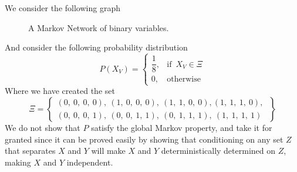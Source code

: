 \documentclass{article}
\numberwithin{equation}{section}
\theoremstyle{named}
\begin{document}
We consider the following graph
\begin{figure}[H]
        \centering
        
        \caption{A Markov Network of binary variables.}
        \label{fig:HCMarkovNetwork}
\end{figure}
And consider the following probability distribution
\[
        P(X_V) = \left\{ 
                \begin{matrix}
                        \dfrac{1}{8},& \text{if }\, X_V \in \Xi \\[3ex]
                        0,& \text{otherwise}

                        
                \end{matrix}
        \right.
\]
Where we have created the set 
\[
        \Xi = \left\{
                \begin{matrix}
                        (0,\ 0,\ 0,\ 0),\ (1,\ 0,\ 0,\ 0),\ (1,\ 1,\ 0,\ 0), 
                        (1,\ 1,\ 1,\ 0),\ \\[2ex] (0,\ 0,\ 0,\ 1),\ 
                        (0,\ 0,\ 1,\ 1),\ (0,\ 1,\ 1,\ 1),\ 
                        (1,\ 1,\ 1,\ 1)
                \end{matrix}
        \right\}
\]
We do not show that $P$ satisfy the global Markov property, and take it for 
granted since it can be proved easily by showing that conditioning on 
any set $Z$ that separates $X$ and $Y$ will make $X$ and $Y$ deterministically 
determined on $Z$, making $X$ and $Y$ independent.
\end{document}
